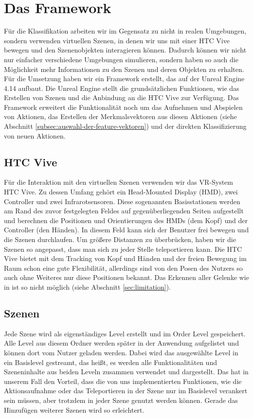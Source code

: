 
\section{Das Framework}
\label{sec:framework}
Für die Klassifikation arbeiten wir im Gegensatz zu \cite{scene-grok} nicht in realen Umgebungen, sondern verwenden virtuellen Szenen, in denen wir uns mit einer HTC Vive \cite{htc-vive} bewegen und den Szenenobjekten interagieren können. Dadurch können wir nicht nur einfacher verschiedene Umgebungen simulieren, sondern haben so auch die Möglichkeit mehr Informationen zu den Szenen und deren Objekten zu erhalten.
Für die Umsetzung haben wir ein Framework erstellt, das auf der Unreal Engine 4.14 \cite{ue4} aufbaut. Die Unreal Engine stellt die grundsätzlichen Funktionen, wie das Erstellen von Szenen und die Anbindung an die HTC Vive zur Verfügung. Das Framework erweitert die Funktionalität noch um das Aufnehmen und Abspielen von Aktionen, das Erstellen der Merkmalsvektoren aus diesen Aktionen (siehe Abschnitt \ref{subsec:auswahl-der-feature-vektoren}) und der direkten Klassifizierung von neuen Aktionen.

\subsection{HTC Vive}
Für die Interaktion mit den virtuellen Szenen verwenden wir das VR-System HTC Vive. Zu dessen Umfang gehört ein Head-Mounted Display (HMD), zwei Controller und zwei Infrarotsensoren. Diese sogenannten Basisstationen werden am Rand des zuvor festgelegten Feldes auf gegenüberliegenden Seiten aufgestellt und berechnen die Positionen und Orientierungen des HMDs (dem Kopf) und der Controller (den Händen). In diesem Feld kann sich der Benutzer frei bewegen und die Szenen durchlaufen. Um größere Distanzen zu überbrücken, haben wir die Szenen so angepasst, dass man sich zu jeder Stelle teleportieren kann. Die HTC Vive bietet mit dem Tracking von Kopf und Händen und der freien Bewegung im Raum schon eine gute Flexibilität, allerdings sind von den Posen des Nutzers so auch ohne Weiteres nur diese Positionen bekannt. Das Erkennen aller Gelenke wie in \cite{scene-grok} ist so nicht möglich (siehe Abschnitt \ref{sec:limitation}).

\subsection{Szenen}
Jede Szene wird als eigenständiges Level erstellt und im Order \glqq{}Level\grqq{} gespeichert. Alle Level aus diesem Ordner werden später in der Anwendung aufgelistet und können dort vom Nutzer geladen werden. Dabei wird das ausgewählte Level in ein Basislevel \glqq{}gestreamt\grqq{}, das heißt, es werden alle Funktionalitäten und Szeneninhalte aus beiden Leveln zusammen verwendet und dargestellt. Das hat in unserem Fall den Vorteil, dass die von uns implementierten Funktionen, wie die Aktionsaufnahme oder das Teleportieren in der Szene nur im Basislevel verankert sein müssen, aber trotzdem in jeder Szene genutzt werden können. Gerade das Hinzufügen weiterer Szenen wird so erleichtert.

